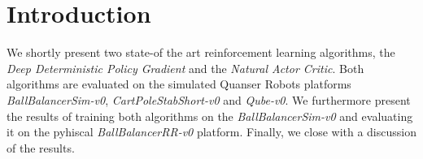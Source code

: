 
\author{Yannik P. Frisch \and Tabea A. Wilke \and Maximilian A. Gehrke %
}


\date{Hand-in: 15 March 2019}

\maketitle

\section{Introduction}
\label{sec:intro}
We shortly present two state-of the art reinforcement learning algorithms, the 
\textit{Deep Deterministic Policy Gradient} and the \textit{Natural Actor 
Critic}. Both algorithms are evaluated on the simulated Quanser Robots 
platforms \textit{BallBalancerSim-v0}, \textit{CartPoleStabShort-v0} and 
\textit{Qube-v0}. We furthermore present the results of training both 
algorithms on the \textit{BallBalancerSim-v0} and evaluating it on the pyhiscal 
\textit{BallBalancerRR-v0} platform. Finally, we close with a discussion of the 
results.
\newpage
